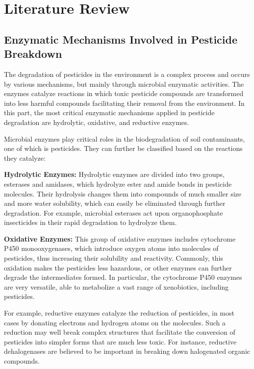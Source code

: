 \section{Literature Review}

\subsection{Enzymatic Mechanisms Involved in Pesticide Breakdown}
\label{sec:Enzymatic Mechanisms Involved in Pesticide Breakdown}

The degradation of pesticides in the environment is a complex process and occurs by various mechanisms, but mainly through microbial enzymatic activities. The enzymes catalyze reactions in which toxic pesticide compounds are transformed into less harmful compounds facilitating their removal from the environment. In this part, the most critical enzymatic mechanisms applied in pesticide degradation are hydrolytic, oxidative, and reductive enzymes.

Microbial enzymes play critical roles in the biodegradation of soil contaminants, one of which is pesticides. They can further be classified based on the reactions they catalyze:

\textbf{Hydrolytic Enzymes:} Hydrolytic enzymes are divided into two groups, esterases and amidases, which hydrolyze ester and amide bonds in pesticide molecules. Their hydrolysis changes them into compounds of much smaller size and more water solubility, which can easily be eliminated through further degradation. For example, microbial esterases act upon organophosphate insecticides in their rapid degradation to hydrolyze them.

\textbf{Oxidative Enzymes:} This group of oxidative enzymes includes cytochrome P450 monooxygenases, which introduce oxygen atoms into molecules of pesticides, thus increasing their solubility and reactivity. Commonly, this oxidation makes the pesticides less hazardous, or other enzymes can further degrade the intermediates formed. In particular, the cytochrome P450 enzymes are very versatile, able to metabolize a vast range of xenobiotics, including pesticides.

For example, reductive enzymes catalyze the reduction of pesticides, in most cases by donating electrons and hydrogen atoms on the molecules. Such a reduction may well break complex structures that facilitate the conversion of pesticides into simpler forms that are much less toxic. For instance, reductive dehalogenases are believed to be important in breaking down halogenated organic compounds.

